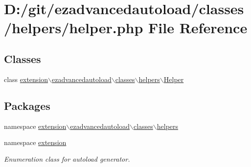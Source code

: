 \hypertarget{helper_8php}{\section{\-D\-:/git/ezadvancedautoload/classes/helpers/helper.php \-File \-Reference}
\label{helper_8php}
}
\subsection*{\-Classes}
\begin{DoxyCompactItemize}
\item 
class \hyperlink{classextension_1_1ezadvancedautoload_1_1classes_1_1helpers_1_1_helper}{extension$\backslash$ezadvancedautoload$\backslash$classes$\backslash$helpers$\backslash$\-Helper}
\end{DoxyCompactItemize}
\subsection*{\-Packages}
\begin{DoxyCompactItemize}
\item 
namespace \hyperlink{namespaceextension_1_1ezadvancedautoload_1_1classes_1_1helpers}{extension$\backslash$ezadvancedautoload$\backslash$classes$\backslash$helpers}
\item 
namespace \hyperlink{namespaceextension}{extension}
\begin{DoxyCompactList}\small\item\em \-Enumeration class for autoload generator. \end{DoxyCompactList}\end{DoxyCompactItemize}
